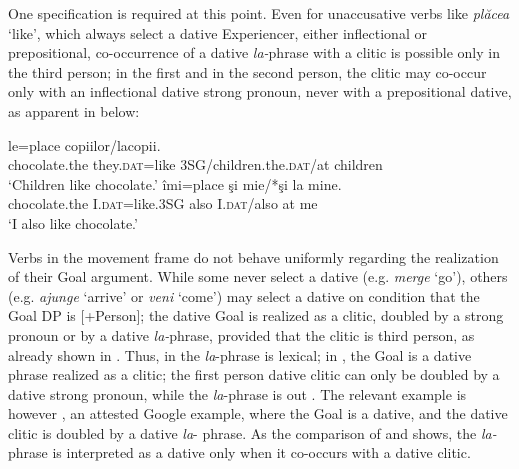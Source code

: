 \documentclass[output=paper,colorlinks,citecolor=brown,nonflat]{langsci/langscibook}
\begin{document}
One specification is required at this point. Even for unaccusative verbs like \textit{plăcea} ‘like’, which always select a dative Experiencer, either inflectional or prepositional, co-occurrence of a dative \textit{la-}phrase with a clitic is possible only in the third person; in the first and in the second person, the clitic may co-occur only with an inflectional dative strong pronoun, never with a prepositional dative, as apparent in  below:

\ea%
    \label{ex:cornilescu:10}
    \ea
     {le=place}  {copiilor}/{la}{copii}. 	\\
    	chocolate.the  they.\textsc{dat}=like 3SG/children.the.\textsc{dat}/at children	\\
    \glt‘Children like chocolate.’
    \ex \label{ex:cornilescu:10b}
     {îmi=place} {şi} {mie}/*şi {la} mine.\\
    	chocolate.the  I.\textsc{dat}=like.3SG also I.\textsc{dat}/also at me\\
    \glt ‘I also like chocolate.’
    \z
    \z

Verbs in the movement frame do not behave uniformly regarding the realization of their Goal argument. While some never select a dative (e.g. \textit{merge} ‘go’), others (e.g. \textit{ajunge} ‘arrive’ or \textit{veni} ‘come’) may select a dative on condition that the Goal DP is [+Person]; the dative Goal is realized as a clitic, doubled by a strong pronoun or by a dative \textit{la-}phrase, provided that the clitic is third person, as already shown in . Thus, in  the \textit{la}-phrase is lexical; in , the Goal is a dative phrase realized as a clitic; the first person dative clitic can only be doubled by a dative strong pronoun, while the \textit{la}{}-phrase is out . The relevant example is however , an attested Google example, where the Goal is a dative, and the dative clitic is doubled by a dative \textit{la}{}- phrase. As the comparison of  and  shows, the \textit{la-}phrase is interpreted as a dative only when it co-occurs with a dative clitic.
\end{document}

